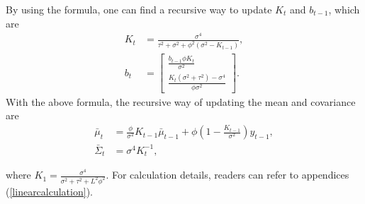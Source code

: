 By using the formula, one can find a recursive way to update $K_{t}$ and $b_{t-1}$, which are 
\begin{align}
K_{t}  &=\frac{\sigma^4}{\tau^2+\sigma^2+\phi^2(\sigma^2-K_{t-1})},\\
b_{t} &= \begin{bmatrix}
\frac{b_{t-1}\phi K_{t}}{\sigma^2} \\ \frac{K_{t}(\sigma^2+\tau^2)-\sigma^4 }{\phi\sigma^2}
\end{bmatrix}. 
\end{align}
With the above formula, the recursive way of updating the mean and covariance are 
\begin{align}
\bar{\mu}_{t}       & = \frac{\phi}{\sigma^2}K_{t-1}\bar{\mu}_{t-1} + \phi (1 - \frac{K_{t-1}}{\sigma^2})y_{t-1}, \\
\bar{\Sigma}_{t}  &= \sigma^4K_{t}^{-1},
\end{align}

where $K_1=\frac{\sigma^4}{\sigma^2+\tau^2+L^2\phi^2}$. For calculation details, readers can refer to appendices (\ref{linearcalculation}). 


